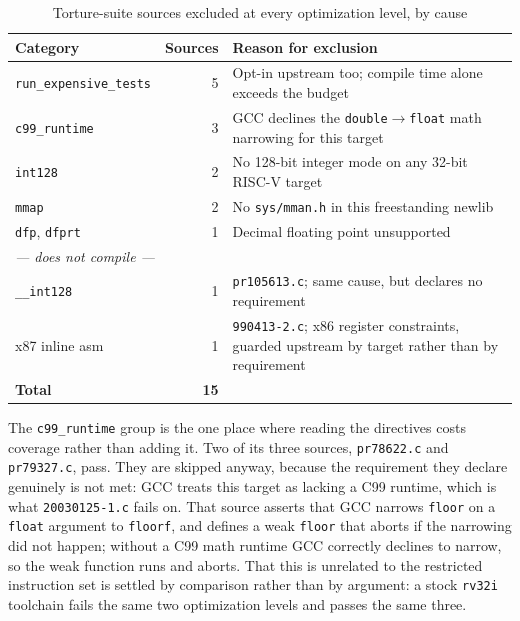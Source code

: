 \begin{table}[htb]
\centering
\caption{Torture-suite sources excluded at every optimization level, by cause}
\label{tab:torture-skips}
\begin{tabular}{lrp{7.2cm}}
\toprule
\textbf{Category} & \textbf{Sources} & \textbf{Reason for exclusion} \\
\midrule
\texttt{run\_expensive\_tests} & 5 & Opt-in upstream too; compile time alone exceeds the budget \\
\texttt{c99\_runtime} & 3 & GCC declines the \texttt{double}$\rightarrow$\texttt{float} math narrowing for this target \\
\texttt{int128} & 2 & No 128-bit integer mode on any 32-bit RISC-V target \\
\texttt{mmap} & 2 & No \texttt{sys/mman.h} in this freestanding newlib \\
\texttt{dfp}, \texttt{dfprt} & 1 & Decimal floating point unsupported \\
\multicolumn{3}{l}{\textit{--- does not compile ---}} \\
\texttt{\_\_int128} & 1 & \texttt{pr105613.c}; same cause, but declares no requirement \\
x87 inline asm & 1 & \texttt{990413-2.c}; x86 register constraints, guarded upstream by target rather than by requirement \\
\midrule
\textbf{Total} & \textbf{15} & \\
\bottomrule
\end{tabular}
\end{table}

The \texttt{c99\_runtime} group is the one place where reading the directives costs coverage rather
than adding it. Two of its three sources, \texttt{pr78622.c} and \texttt{pr79327.c}, pass. They are
skipped anyway, because the requirement they declare genuinely is not met: GCC treats this target as
lacking a C99 runtime, which is what \texttt{20030125-1.c} fails on. That source
asserts that GCC narrows \texttt{floor} on a \texttt{float} argument to \texttt{floorf}, and defines a
weak \texttt{floor} that aborts if the narrowing did not happen; without a C99 math runtime GCC
correctly declines to narrow, so the weak function runs and aborts. That this is unrelated to the
restricted instruction set is settled by comparison rather than by argument: a stock \texttt{rv32i}
toolchain fails the same two optimization levels and passes the same three.

